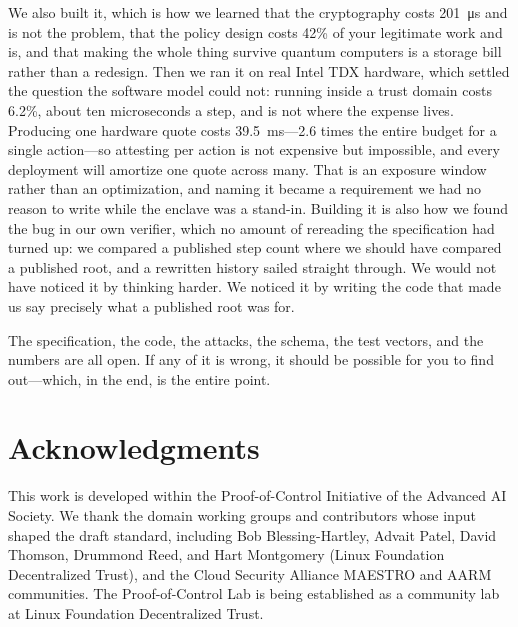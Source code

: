 \documentclass[11pt]{article}
\newcommand{\poc}{Proof-of-Control}
\begin{document}
We also built it, which is how we learned that the cryptography costs
\SI{201}{\micro\second} and is not the problem, that the policy design costs
42\% of your legitimate work and is, and that making the whole thing survive
quantum computers is a storage bill rather than a redesign. Then we ran it on
real Intel TDX hardware, which settled the question the software model could
not: running inside a trust domain costs 6.2\%, about ten microseconds a step,
and is not where the expense lives. Producing one hardware quote costs
\SI{39.5}{\milli\second}---2.6 times the entire budget for a single
action---so attesting per action is not expensive but impossible, and every
deployment will amortize one quote across many. That is an exposure window
rather than an optimization, and naming it became a requirement we had no
reason to write while the enclave was a stand-in. Building it is also
how we found the bug in our own verifier, which no amount of rereading the
specification had turned up: we compared a published step count where we should
have compared a published root, and a rewritten history sailed straight through.
We would not have noticed it by thinking harder. We noticed it by writing the
code that made us say precisely what a published root was for.

The specification, the code, the attacks, the schema, the test vectors, and the
numbers are all open. If any of it is wrong, it should be possible for you to
find out---which, in the end, is the entire point.


\section*{Acknowledgments}
This work is developed within the \poc{} Initiative of the Advanced AI
Society. We thank the domain working groups and contributors whose input
shaped the draft standard, including Bob Blessing-Hartley, Advait Patel,
David Thomson, Drummond Reed, and Hart Montgomery (Linux Foundation
Decentralized Trust), and the Cloud Security Alliance MAESTRO and AARM
communities. The \poc{} Lab is being established as a community lab at Linux
Foundation Decentralized Trust.

\appendix
\end{document}
